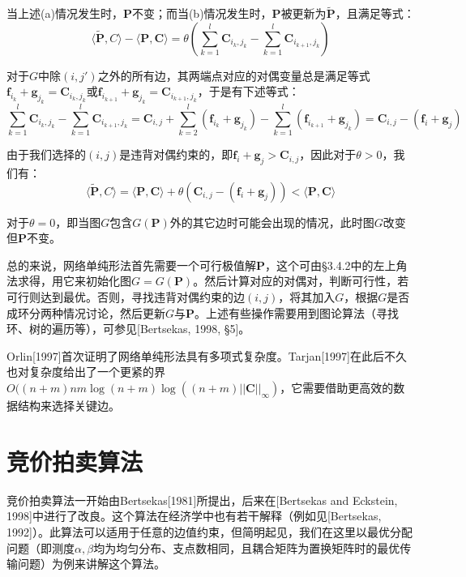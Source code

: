 \documentclass[cn,10pt,math=newtx,citestyle=gb7714-2015,bibstyle=gb7714-2015]{elegantbook}
\begin{document}
当上述(a)情况发生时，$\mathbf{P}$不变；而当(b)情况发生时，$\mathbf{P}$被更新为$\mathbf{\tilde P}$，且满足等式：
\begin{equation*}
    \langle \mathbf{\tilde P},C\rangle - \langle \mathbf{P,C} \rangle = \theta \left( \sum_{k=1}^l \mathbf{C}_{i_k,j_k} - \sum_{k=1}^l \mathbf{C}_{i_{k+1},j_k}  \right)
\end{equation*}

对于$G$中除$(i,j')$之外的所有边，其两端点对应的对偶变量总是满足等式$\mathbf{f}_{i_k}+\mathbf{g}_{j_k}=\mathbf{C}_{i_k,j_k}$或$\mathbf{f}_{i_{k+1}}+\mathbf{g}_{j_k}=\mathbf{C}_{i_{k+1},j_k}$，于是有下述等式：
\begin{equation*}
    \sum_{k=1}^l \mathbf{C}_{i_k,j_k}- \sum_{k=1}^l \mathbf{C}_{i_{k+1},j_k} = \mathbf{C}_{i,j} + \sum_{k=2}^l (\mathbf{f}_{i_k}+\mathbf{g}_{j_k}) - \sum_{k=1}^l (\mathbf{f}_{i_{k+1}}+\mathbf{g}_{j_k}) = \mathbf{C}_{i,j}-(\mathbf{f}_i+\mathbf{g}_j)
\end{equation*}

由于我们选择的$(i,j)$是违背对偶约束的，即$\mathbf{f}_i+\mathbf{g}_j>\mathbf{C}_{i,j}$，因此对于$\theta>0$，我们有：
\begin{equation*}
    \langle \mathbf{\tilde P},C\rangle = \langle \mathbf{P,C} \rangle + \theta (\mathbf{C}_{i,j}-(\mathbf{f}_i+\mathbf{g}_j)) < \langle \mathbf{P,C} \rangle
\end{equation*}

对于$\theta=0$，即当图$G$包含$G(\mathbf{P})$外的其它边时可能会出现的情况，此时图$G$改变但$\mathbf{P}$不变。

\vspace{1.5em}

总的来说，网络单纯形法首先需要一个可行极值解$\mathbf{P}$，这个可由\S 3.4.2中的左上角法求得，用它来初始化图$G=G(\mathbf{P})$。然后计算对应的对偶对，判断可行性，若可行则达到最优。否则，寻找违背对偶约束的边$(i,j)$，将其加入$G$，根据$G$是否成环分两种情况讨论，然后更新$G$与$\mathbf{P}$。上述有些操作需要用到图论算法（寻找环、树的遍历等），可参见[Bertsekas, 1998, \S 5]。

Orlin[1997]首次证明了网络单纯形法具有多项式复杂度。Tarjan[1997]在此后不久也对复杂度给出了一个更紧的界$O((n+m)nm\log (n+m)\log((n+m)||\mathbf{C}||_\infty)$，它需要借助更高效的数据结构来选择关键边。

\section{竞价拍卖算法}

竞价拍卖算法一开始由Bertsekas[1981]所提出，后来在[Bertsekas and Eckstein, 1998]中进行了改良。这个算法在经济学中也有若干解释（例如见[Bertsekas, 1992]）。此算法可以适用于任意的边值约束，但简明起见，我们在这里以最优分配问题（即测度$\alpha,\beta$均为均匀分布、支点数相同，且耦合矩阵为置换矩阵时的最优传输问题）为例来讲解这个算法。
\end{document}
